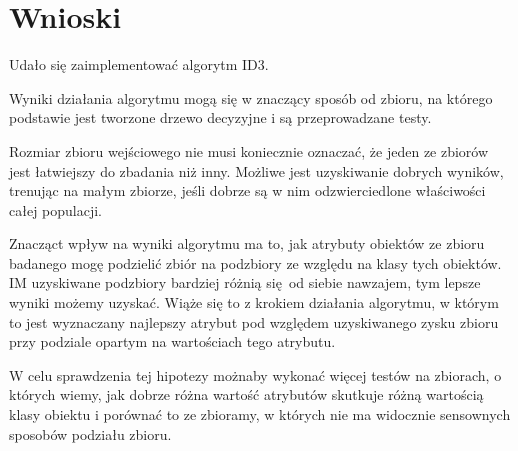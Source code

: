 \section{Wnioski}

Udało się zaimplementować algorytm ID3.

Wyniki działania algorytmu mogą się w znaczący sposób od zbioru, na którego
podstawie jest tworzone drzewo decyzyjne i są przeprowadzane testy.

Rozmiar zbioru wejściowego nie musi koniecznie oznaczać, że jeden ze zbiorów
jest łatwiejszy do zbadania niż inny. Możliwe jest uzyskiwanie dobrych wyników,
trenując na małym zbiorze, jeśli dobrze są w nim odzwierciedlone właściwości
całej populacji.

Znacząct wpływ na wyniki algorytmu ma to, jak atrybuty obiektów ze zbioru
badanego mogę podzielić zbiór na podzbiory ze względu na klasy tych obiektów.
IM uzyskiwane podzbiory bardziej różnią się od siebie nawzajem, tym lepsze
wyniki możemy uzyskać. Wiąże się to z krokiem działania algorytmu, w którym to
jest wyznaczany najlepszy atrybut pod względem uzyskiwanego zysku zbioru przy
podziale opartym na wartościach tego atrybutu.

W celu sprawdzenia tej hipotezy możnaby wykonać więcej testów na zbiorach, o
których wiemy, jak dobrze różna wartość atrybutów skutkuje różną wartością
klasy obiektu i porównać to ze zbioramy, w których nie ma widocznie sensownych
sposobów podziału zbioru.
